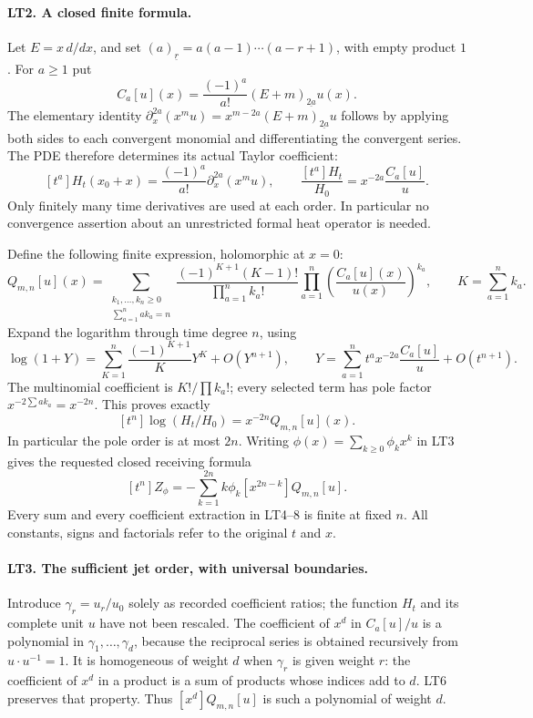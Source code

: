 \paragraph{LT2. A closed finite formula.}
Let $E=x\,d/dx$, and set $(a)_{\underline r}
=a(a-1)\cdots(a-r+1)$, with empty product $1$.
For $a\ge1$ put
\[
 C_a[u](x)=\frac{(-1)^a}{a!}
             (E+m)_{\underline{2a}}u(x).
 \tag{LT4}
\]
The elementary identity
$\partial_x^{2a}(x^mu)=x^{m-2a}
(E+m)_{\underline{2a}}u$ follows by applying both sides to each
convergent monomial and differentiating the convergent series.
The PDE therefore determines its actual Taylor coefficient:
\[
 [t^a]H_t(x_0+x)=\frac{(-1)^a}{a!}
                       \partial_x^{2a}(x^mu),\qquad
 \frac{[t^a]H_t}{H_0}=x^{-2a}\frac{C_a[u]}u.
 \tag{LT5}
\]
Only finitely many time derivatives are used at each order.
In particular no convergence assertion about an unrestricted
formal heat operator is needed.

Define the following finite expression, holomorphic at $x=0$:
\[
 Q_{m,n}[u](x)=
 \sum_{\substack{k_1,\ldots,k_n\ge0\\
                  \sum_{a=1}^n a k_a=n}}
 \frac{(-1)^{K+1}(K-1)!}{\prod_{a=1}^n k_a!}
       \prod_{a=1}^n\left(\frac{C_a[u](x)}{u(x)}\right)^{k_a},
 \qquad K=\sum_{a=1}^n k_a.
 \tag{LT6}
\]
Expand the logarithm through time degree $n$, using
\[
 \log(1+Y)=\sum_{K=1}^n\frac{(-1)^{K+1}}K Y^K+O(Y^{n+1}),
 \qquad
 Y=\sum_{a=1}^n t^a x^{-2a}\frac{C_a[u]}u+O(t^{n+1}).
\]
The multinomial coefficient is $K!/\prod k_a!$; every selected
term has pole factor $x^{-2\sum a k_a}=x^{-2n}$.
This proves exactly
\[
 [t^n]\log(H_t/H_0)=x^{-2n}Q_{m,n}[u](x).
 \tag{LT7}
\]
In particular the pole order is at most $2n$.
Writing $\phi(x)=\sum_{k\ge0}\phi_kx^k$ in LT3 gives the
requested closed receiving formula
\[
 \boxed{[t^n]Z_\phi
   =-\sum_{k=1}^{2n}k\phi_k
                 [x^{2n-k}]Q_{m,n}[u].}
 \tag{LT8}
\]
Every sum and every coefficient extraction in LT4--8 is finite
at fixed $n$. All constants, signs and factorials refer to the
original $t$ and $x$.

\paragraph{LT3. The sufficient jet order, with universal boundaries.}
Introduce $\gamma_r=u_r/u_0$ solely as recorded coefficient ratios;
the function $H_t$ and its complete unit $u$ have not been rescaled.
The coefficient of $x^d$ in $C_a[u]/u$ is a polynomial in
$\gamma_1,\ldots,\gamma_d$, because the reciprocal series is
obtained recursively from $u\cdot u^{-1}=1$. It is homogeneous
of weight $d$ when $\gamma_r$ is given weight $r$:
the coefficient of $x^d$ in a product is a sum of products whose
indices add to $d$. LT6 preserves that property. Thus
$[x^d]Q_{m,n}[u]$ is such a polynomial of weight $d$.

